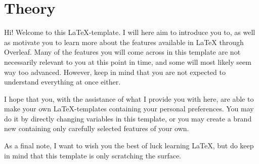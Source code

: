 \section{Theory}

Hi! 
Welcome to this \LaTeX-template. I will here aim to introduce you to, as well as motivate you to learn more about the features available in LaTeX through Overleaf. Many of the features you will come across in this template are not necessarily relevant to you at this point in time, and some will most likely seem way too advanced. However, keep in mind that you are not expected to understand everything at once either.

I hope that you, with the assistance of what I provide you with here, are able to make your own LaTeX-templates containing your personal preferences. You may do it by directly changing variables in this template, or you may create a brand new containing only carefully selected features of your own. 

As a final note, I want to wish you the best of luck learning LaTeX, but do keep in mind that this template is only scratching the surface.
